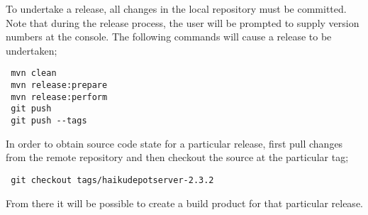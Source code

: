  To undertake a release, all changes in the local repository must be committed.  Note that during the release process, the user will be prompted to supply version numbers at the console.  The following commands will cause a release to be undertaken;

 \begin{verbatim}
 mvn clean
 mvn release:prepare
 mvn release:perform
 git push
 git push --tags
 \end{verbatim}

 In order to obtain source code state for a particular release, first pull changes from the remote repository and then checkout the source at the particular tag;

 \begin{verbatim}
 git checkout tags/haikudepotserver-2.3.2
 \end{verbatim}

 From there it will be possible to create a build product for that particular release.